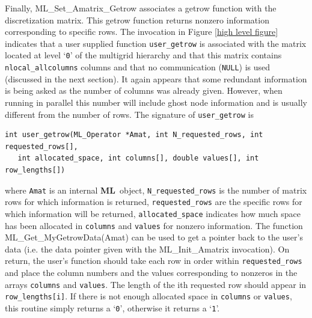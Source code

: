 \documentclass{article}[11pt]
\newcommand{\ML}     {{\bf ML}}
\begin{document}
Finally, {\sf ML\_Set\_Amatrix\_Getrow} associates a getrow function with 
the discretization matrix.  This getrow function returns nonzero information 
corresponding to specific rows.  
The invocation 
in Figure \ref{high level figure}
indicates that a user supplied function {\tt user\_getrow} is 
associated with the matrix located at level `{\tt 0}' of the multigrid
hierarchy and that this matrix contains {\tt nlocal\_allcolumns} columns 
and that no communication ({\tt NULL})
is used (discussed in the next section).
It again appears that some redundant information is being asked as the 
number of columns was already given. However, when running in parallel
this number will include ghost node information and is usually different
from the number of rows.
The signature of {\tt user\_getrow} is
%
\begin{verbatim}
int user_getrow(ML_Operator *Amat, int N_requested_rows, int requested_rows[],
   int allocated_space, int columns[], double values[], int row_lengths[])
\end{verbatim}
%
where {\tt Amat} is an internal \ML\ object,
{\tt N\_requested\_rows} is the number of matrix rows for which 
information is
returned, {\tt requested\_rows} are the specific rows for which information will be returned,
{\tt allocated\_space} indicates how much space has been allocated in 
{\tt columns}
and {\tt values} for nonzero information. 
The function {\sf ML\_Get\_MyGetrowData(Amat)} can be used to get
a pointer back to the user's data (i.e. the data pointer given with 
the {\sf ML\_Init\_Amatrix} invocation). On return, the user's function
should take each row in order within {\tt requested\_rows} and place the 
column numbers and the values corresponding to nonzeros in the 
arrays {\tt columns} and {\tt values}. The length of the ith requested row
should appear in {\tt row\_lengths[i]}. If there is not enough allocated 
space in {\tt columns} or {\tt values}, this routine simply returns a `{\tt 0}',
otherwise it returns a `{\tt 1}'.
\end{document}
